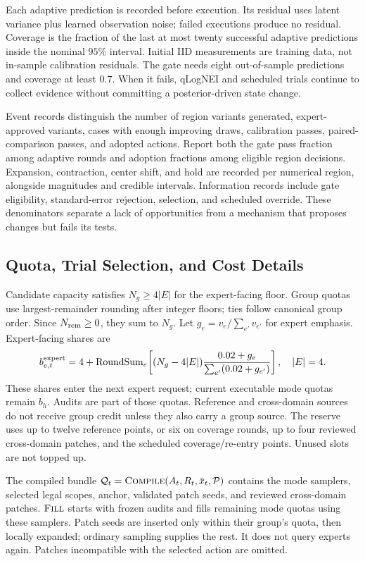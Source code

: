 Each adaptive prediction is recorded before execution. Its residual
uses latent variance plus learned observation noise; failed executions
produce no residual. Coverage is the fraction of the last at most twenty
successful adaptive predictions inside the nominal $95\%$ interval.
Initial IID measurements are training data, not in-sample calibration
residuals. The gate needs eight out-of-sample predictions and coverage
at least $0.7$. When it fails, qLogNEI and scheduled trials continue to
collect evidence without committing a posterior-driven state change.

Event records distinguish the number of region variants generated,
expert-approved variants, cases with enough improving draws, calibration passes,
paired-comparison passes, and adopted actions. Report both the gate pass
fraction among adaptive rounds and adoption fractions among eligible
region decisions. Expansion, contraction, center shift, and hold are
recorded per numerical region, alongside magnitudes and credible intervals.
Information records include gate eligibility, standard-error rejection,
selection, and scheduled override. These denominators separate a lack of
opportunities from a mechanism that proposes changes but fails its tests.

\subsection{Quota, Trial Selection, and Cost Details}

Candidate capacity satisfies $N_g\geq4|E|$ for the expert-facing floor.
Group quotas use largest-remainder rounding after integer floors; ties
follow canonical group order. Since $N_{\rm rem}\geq0$, they sum to $N_g$.
Let $g_e=v_e/\sum_{e'}v_{e'}$ for expert emphasis. Expert-facing shares are
\begin{equation}
 b^{\rm expert}_{e,t}=4+\operatorname{RoundSum}_e\!\left[
 (N_g-4|E|)\frac{0.02+g_e}{\sum_{e'}(0.02+g_{e'})}\right],\quad |E|=4.
\end{equation}
These shares enter the next expert request; current executable mode
quotas remain $b_h$. Audits are part of those quotas. Reference and
cross-domain sources do not receive group credit unless they also carry
a group source. The reserve uses up to twelve reference points, or six
on coverage rounds, up to four reviewed cross-domain patches, and the
scheduled coverage/re-entry points. Unused slots are not topped up.

The compiled bundle $\mathcal Q_t=\textsc{Compile}(A_t,R_t,\bar x_t,\mathcal P)$
contains the mode samplers, selected legal scopes, anchor, validated patch
seeds, and reviewed cross-domain patches. $\textsc{Fill}$ starts with frozen
audits and fills remaining mode quotas using these samplers. Patch seeds
are inserted only within their group's quota, then locally expanded;
ordinary sampling supplies the rest. It does not query experts again.
Patches incompatible with the selected action are omitted.

